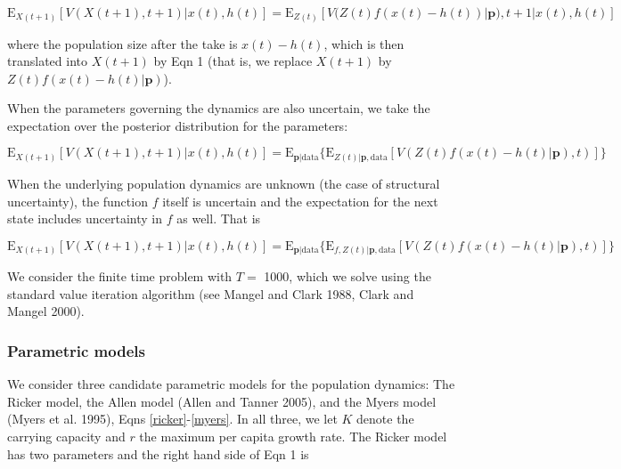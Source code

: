 \documentclass[author-year, 12pt,review]{components/elsarticle} %
\begin{document}
\begin{equation}
\mathbf{\mathrm{E}}_{X(t+1)} \left[ V( X(t+1),t+1) | x(t), h(t) \right] = \mathbf{\mathrm{E}}_{Z(t)} \left[V( Z(t) f(x(t) - h(t))|\mathbf{p}), t+1 | x(t), h(t) \right]
\end{equation}

where the population size after the take is $x(t) - h(t)$, which is then
translated into $X(t+1)$ by Eqn 1 (that is, we replace $X(t+1)$ by
$Z(t) f(x(t)-h(t)|\mathbf{p})$).

When the parameters governing the dynamics are also uncertain, we take
the expectation over the posterior distribution for the parameters:

\begin{equation}
\mathbf{\mathrm{E}}_{X(t+1)} \left[ V(X(t+1), t+1) | x(t), h(t) \right] = \mathbf{\mathrm{E}}_{\mathbf{p}|\mathrm{data}} \{ \mathbf{\mathrm{E}}_{Z(t) | \mathbf{p}, \mathrm{data}} \left[ V(Z(t) f(x(t) - h(t)|\mathbf{p}), t)  \right] \}
\end{equation}

When the underlying population dynamics are unknown (the case of
structural uncertainty), the function $f$ itself is uncertain and the
expectation for the next state includes uncertainty in $f$ as well. That
is

\begin{equation}
\mathbf{\mathrm{E}}_{X(t+1)} \left[ V(X(t+1), t+1) | x(t), h(t) \right] = \mathbf{\mathrm{E}}_{\mathbf{p}|\mathrm{data}} \{ \mathbf{\mathrm{E}}_{f, Z(t) | \mathbf{p}, \mathrm{data}} \left[ V( Z(t) f(x(t) - h(t)| \mathbf{p}), t) \right] \}
\end{equation}

We consider the finite time problem with $T=$ 1000, which we solve using
the standard value iteration algorithm (see Mangel and Clark 1988, Clark
and Mangel 2000).

\subsubsection{Parametric models}\label{parametric-models}

We consider three candidate parametric models for the population
dynamics: The Ricker model, the Allen model (Allen and Tanner 2005), and
the Myers model (Myers et al. 1995), Eqns \eqref{ricker}-\eqref{myers}.
In all three, we let $K$ denote the carrying capacity and $r$ the
maximum per capita growth rate. The Ricker model has two parameters and
the right hand side of Eqn 1 is
\end{document}
